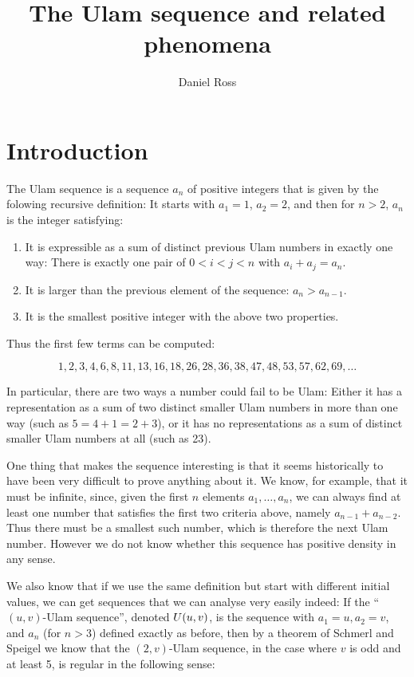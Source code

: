 \documentclass{report}
\title{The Ulam sequence and related phenomena}
\author{Daniel Ross}
\date{ }
\theoremstyle{remark}
\numberwithin{equation}{section}
\begin{document}
\maketitle

\tableofcontents


\chapter{Introduction}

The Ulam sequence is a sequence $a_n$ of positive integers that is given by
the folowing recursive definition: It starts with $a_1 = 1$,
$a_2 = 2$, and then for $n > 2$, $a_n$ is the integer satisfying:
\begin{enumerate}
\item It is expressible as a sum of distinct previous Ulam numbers in
  exactly one way: There is exactly one pair of $0 < i < j < n$ with
  $a_i + a_j = a_n$.
\item It is larger than the previous element of the sequence: $a_n >
  a_{n-1}$.
\item It is the smallest positive integer with the above two
  properties.
\end{enumerate}

Thus the first few terms can be computed: 

\[1, 2, 3, 4, 6, 8, 11, 13, 16, 18, 26, 28, 36, 38, 47, 48, 53, 57, 62,
69, \ldots\]

In particular, there are two ways a number could fail to be Ulam:
Either it has a representation as a sum of two distinct smaller Ulam
numbers in more than one way (such as $5 = 4+1 = 2+3$), or it has no
representations as a sum of distinct smaller Ulam numbers at all (such
as 23).

One thing that makes the sequence interesting is that it seems
historically to have been very difficult to prove anything about it.
We know, for example, that it must be infinite, since, given the first
$n$ elements $a_1, \ldots, a_n$, we can always find at least one
number that satisfies the first two criteria above, namely
$a_{n-1} + a_{n-2}$.  Thus there must be a smallest such number, which
is therefore the next Ulam number.  However we do not know whether
this sequence has positive density in any sense.

We also know that if we use the same definition but start with
different initial values, we can get sequences that we can analyse
very easily indeed: If the ``$(u,v)$-Ulam sequence'', denoted
$U(u,v)$, is the sequence with $a_1 = u, a_2 = v$, and $a_n$ (for
$n > 3$) defined exactly as before, then by a theorem of Schmerl and
Speigel \cite{schmerl:jct1994} we know that the $(2,v)$-Ulam sequence,
in the case where $v$ is odd and at least 5, is regular in the
following sense:
\end{document}
